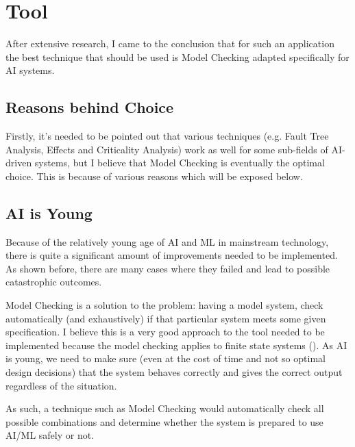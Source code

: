 \documentclass[paper=a4, fontsize=11pt]{scrartcl} %
\numberwithin{equation}{section} %
\numberwithin{figure}{section} %
\numberwithin{table}{section} %
\begin{document}
\section{Tool}

\par
After extensive research, I came to the conclusion that for such an application the best technique that should be used is Model Checking adapted specifically for AI systems. \\


\subsection{Reasons behind Choice}

\par
Firstly, it's needed to be pointed out that various techniques (e.g. Fault Tree Analysis, Effects and Criticality Analysis) work as well for some sub-fields of AI-driven systems, but I believe that Model Checking is eventually the optimal choice. This is because of various reasons which will be exposed below.


\subsection{AI is Young}

\par
Because of the relatively young age of AI and ML in mainstream technology, there is quite a significant amount of improvements needed to be implemented. As shown before, there are many cases where they failed and lead to possible catastrophic outcomes. \\

\par
Model Checking is a solution to the problem: having a model system, check automatically (and exhaustively) if that particular system meets some given specification. I believe this is a very good approach to the tool needed to be implemented because the model checking applies to finite state systems (\citet{wiley-encyclopedia}). As AI is young, we need to make sure (even at the cost of time and not so optimal design decisions) that the system behaves correctly and gives the correct output regardless of the situation.

\par
As such, a technique such as Model Checking would automatically check all possible combinations and determine whether the system is prepared to use AI/ML safely or not.
\end{document}
